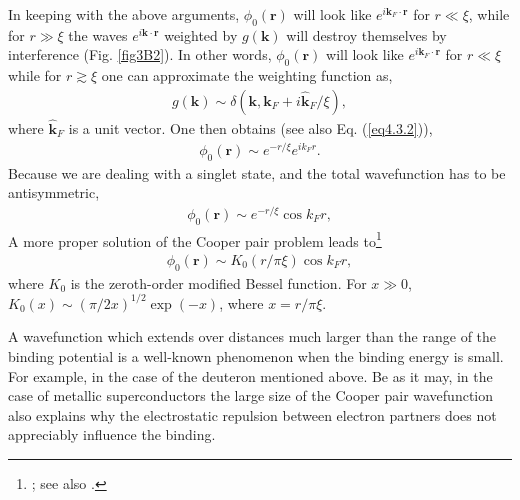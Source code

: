 In keeping with the above arguments, $\phi_0(\mathbf r)$ will look like $e^{i\mathbf k_F\cdot \mathbf r}$ for $r\ll\xi$, while for $r\gg \xi$ the waves $e^{i\mathbf k\cdot \mathbf r}$
weighted by $g(\mathbf k)$ will destroy themselves by interference   (Fig. \ref{fig3B2}). In other words, $\phi_0(\mathbf r)$ will look like $e^{i\mathbf k_F\cdot \mathbf r}$ for $r\ll\xi$ while for $r\gtrsim\xi$ one can approximate the weighting function as,
\begin{align}\label{eq3B7}
g(\mathbf k)\sim\delta(\mathbf k,\mathbf k_F+i\mathbf{\hat k}_F/\xi),
\end{align}
where $\mathbf{\hat k}_F$ is a unit vector. One then obtains (see also Eq. (\ref{eq4.3.2})),
\begin{align}\label{eq3B8}
\phi_0(\mathbf r)\sim e^{-r/\xi}e^{ik_Fr}.
\end{align}
Because we are dealing with a singlet state, and the total wavefunction has to be antisymmetric,
\begin{align}\label{eq3B9}
\phi_0(\mathbf r)\sim e^{-r/\xi}\cos k_Fr,
\end{align}
 A more proper solution of the Cooper pair problem leads to\footnote{\cite{Kadin:07}; see also \cite{VanWitsen:14}.}
\begin{align}\label{eq3B10}
\phi_0(\mathbf r)\sim K_0(r/\pi\xi)\cos k_Fr,
\end{align}
where $K_0$ is the zeroth-order modified Bessel function. For $x\gg 0$, $K_0(x)\sim (\pi/2x)^{1/2}\exp(-x)$, where $x=r/\pi\xi$.

A wavefunction which extends over distances much larger than the range of the binding potential is a well-known phenomenon when the binding energy is small. For example,  in the case of the deuteron mentioned above.  Be as it may, in the case of metallic superconductors the large size of the Cooper pair wavefunction also explains why the electrostatic repulsion between electron partners does not appreciably influence the binding. 


